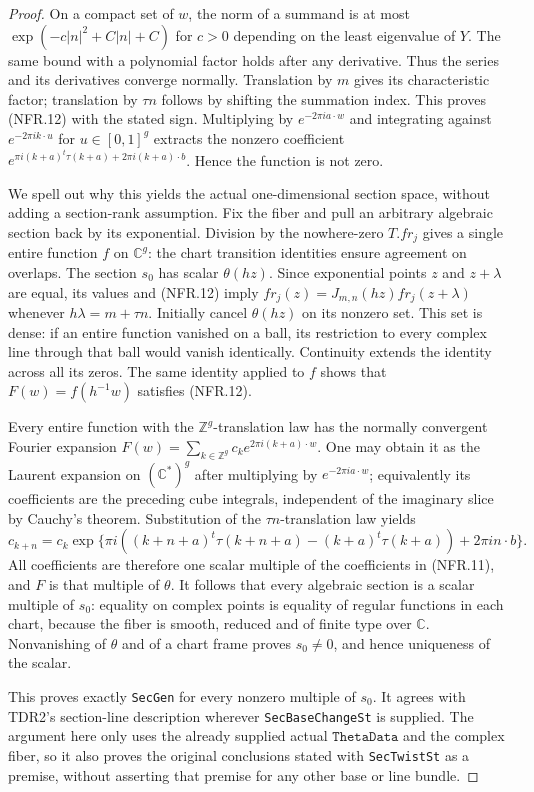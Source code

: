 \begin{proof}
On a compact set of $w$, the norm of a summand is at most
$\exp(-c|n|^2+C|n|+C)$ for $c>0$ depending on the least
eigenvalue of $Y$.  The same bound with a polynomial factor holds
after any derivative.  Thus the series and its derivatives converge
normally.  Translation by $m$ gives its characteristic factor;
translation by $\tau n$ follows by shifting the summation index.
This proves (NFR.12) with the stated sign.
Multiplying by $e^{-2\pi ia\cdot w}$ and integrating against
$e^{-2\pi ik\cdot u}$ for $u\in[0,1]^g$ extracts the nonzero
coefficient
$e^{\pi i(k+a)^t\tau(k+a)+2\pi i(k+a)\cdot b}$.
Hence the function is not zero.

We spell out why this yields the actual one-dimensional section
space, without adding a section-rank assumption.
Fix the fiber and pull an arbitrary algebraic section back by its
exponential.  Division by the nowhere-zero $T.fr_j$ gives a
single entire function $f$ on $\mathbb C^g$: the chart transition
identities ensure agreement on overlaps.  The section $s_0$
has scalar $\theta(hz)$.
Since exponential points $z$ and $z+\lambda$ are equal, its
values and (NFR.12) imply
$fr_j(z)=J_{m,n}(hz)fr_j(z+\lambda)$ whenever
$h\lambda=m+\tau n$.
Initially cancel $\theta(hz)$ on its nonzero set.  This set is
dense: if an entire function vanished on a ball, its restriction
to every complex line through that ball would vanish identically.
Continuity extends the identity across all its zeros.
The same identity applied to $f$ shows that $F(w)=f(h^{-1}w)$
satisfies (NFR.12).

Every entire function with the $\mathbb Z^g$-translation law
has the normally convergent Fourier expansion
$F(w)=\sum_{k\in\mathbb Z^g}c_k e^{2\pi i(k+a)\cdot w}$.
One may obtain it as the Laurent expansion on $(\mathbb C^*)^g$
after multiplying by $e^{-2\pi ia\cdot w}$; equivalently its
coefficients are the preceding cube integrals, independent of
the imaginary slice by Cauchy's theorem.
Substitution of the $\tau n$-translation law yields
\[
 c_{k+n}=c_k\exp\{\pi i((k+n+a)^t\tau(k+n+a)
                  -(k+a)^t\tau(k+a))+2\pi in\cdot b\}.
 \tag{NFR.13}
\]
All coefficients are therefore one scalar multiple of the
coefficients in (NFR.11), and $F$ is that multiple of $\theta$.
It follows that every algebraic section is a scalar multiple of
$s_0$: equality on complex points is equality of regular functions
in each chart, because the fiber is smooth, reduced and of finite
type over $\mathbb C$.  Nonvanishing of $\theta$ and of a chart
frame proves $s_0\ne0$, and hence uniqueness of the scalar.

This proves exactly \texttt{SecGen} for every nonzero multiple
of $s_0$.  It agrees with TDR2's section-line description wherever
\texttt{SecBaseChangeSt} is supplied.  The argument here only uses
the already supplied actual $\texttt{ThetaData}$ and the complex
fiber, so it also proves the original conclusions stated with
\texttt{SecTwistSt} as a premise, without asserting that premise
for any other base or line bundle.
\end{proof}

